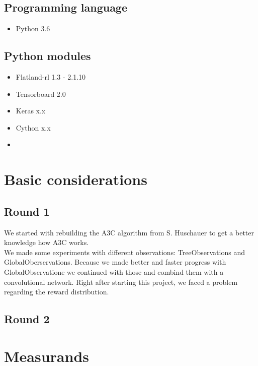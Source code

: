 \subsection*{Programming language}\label{programminglanguages}
\begin{itemize}
	\item Python 3.6
\end{itemize}

\subsection*{Python modules}\label{modules}
\begin{itemize}
	\item Flatland-rl 1.3 - 2.1.10
	\item Tensorboard 2.0
	\item Keras x.x
	\item Cython x.x
	\item %
\end{itemize}


\section{Basic considerations}

\subsection{Round 1}
We started with rebuilding the A3C algorithm from S. Huschauer to get a better knowledge how A3C works.\\
We made some experiments with different observations: TreeObservations and GlobalOberservations.
Because we made better and faster progress with GlobalObservatione we continued with those and combind them with a convolutional network.
Right after starting this project, we faced a problem regarding the reward distribution.\\


\subsection{Round 2}




\section{Measurands}

